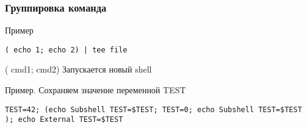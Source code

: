 \begin{frame}[fragile]
	\frametitle{Группировка команда}
	
	\begin{block}{Пример}
\begin{lstlisting}
( echo 1; echo 2) | tee file
\end{lstlisting}
	\end{block}

	\pause
	\begin{block}{( cmd1; cmd2)}
	    Запускается новый shell
	\end{block}

	\begin{block}{Пример. Сохраняем значение переменной TEST}
		\begin{lstlisting}
TEST=42; (echo Subshell TEST=$TEST; TEST=0; echo Subshell TEST=$TEST ); echo External TEST=$TEST
\end{lstlisting}
	\end{block}

\end{frame}
